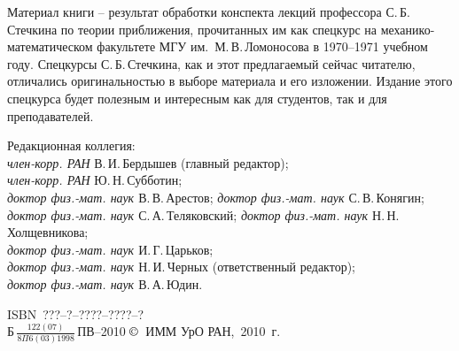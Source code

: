\documentclass{report}
\begin{document}
Материал книги -- результат обработки конспекта
лекций профессора С.\,Б.\,Стечкина по теории приближения,
прочитанных им как спецкурс на
механико-математическом факультете МГУ им.~М.\,В.\,Ло\-моносова в
1970--1971 учебном году. Спецкурсы С.\,Б.\,Стечкина, как и этот предлагаемый сейчас
читателю, отличались оригинальностью в выборе материала и
его изложении. Издание этого спецкурса будет
полезным и интересным как для студентов, так и для
преподавателей.

 \vspace{12mm}
\begin{center}
Редакционная коллегия: \\[2ex] {\em{член-корр. РАН}}
В.\,И.\,Бердышев (главный редактор); \\
 {\em{член-корр. РАН}} Ю.\,Н.\,Субботин;\\
{\em{доктор физ.-мат. наук }} В.\,В.\,Арестов;
{\em{доктор физ.-мат. наук }} С.\,В.\,Конягин; \\
{\em{доктор физ.-мат. наук }} С.\,А.\,Теляковский;
{\em{доктор физ.-мат. наук }} Н.\,Н.\,Холщевникова; \\
{\em{доктор физ.-мат. наук }} И.\,Г.\,Царьков; \\
{\em{доктор физ.-мат. наук }} Н.\,И.\,Черных (ответственный редактор); \\
{\em{доктор физ.-мат. наук }} В.\,А.\,Юдин.

 \end{center} \vfill


\noindent ISBN~???--?--????--????--?\\[12pt] Б\,$\frac{\textstyle
122(07)}{\textstyle 8\Pi 6(03)1998}$\,ПВ--2010\hfill
 $\copyright$\  ИММ УрО РАН,\ 2010~г.

\bigskip






\renewcommand{\chaptername}{Лекция}
\large
\sloppy

 \tableofcontents %
 
 
 
 
 
 
 
 
 
 
 
 
 
 
 
 
 
 
 
 
 
\end{document}
